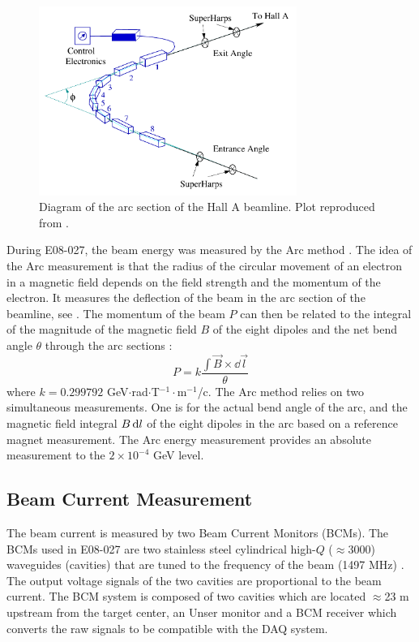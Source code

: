 \begin{figure}[b!]
  \centering
  \includegraphics[width=0.75\textwidth]{figs/arc-measurement.pdf}
  \caption[Diagram of the arc section of the beamline.]{Diagram of the arc section of the Hall A beamline. Plot reproduced from \cite{Zheng2002}.  \label{C5S2SS1F1}}
\end{figure}

During E08-027, the beam energy was measured by the Arc method \cite{Alcorn2004}. The idea of the Arc measurement is that the radius of the circular movement of an electron in a magnetic field depends on the field strength and the momentum of the electron. It measures the deflection of the beam in the arc section of the beamline, see . The momentum of the beam $P$ can then be related to the integral of the magnitude of the magnetic field $B$ of the eight dipoles and the net bend angle $\theta$ through the arc sections \cite{BEAMENERGYARC}:
\begin{equation} \label{C5S2SS1E1}
P = k \frac{\int\vec{B}\times\dd{\vec{l}}}{\theta}
\end{equation}
where $k=0.299792$ GeV$\cdot$rad$\cdot$T${}^{-1}\cdot$m${}^{-1}$/c. The Arc method relies on two simultaneous measurements. One is for the actual bend angle of the arc, and the magnetic field integral $B\dd{l}$ of the eight dipoles in the arc based on a reference magnet measurement. The Arc energy measurement provides an absolute measurement to the $2\times10^{-4}$ GeV level.

\subsection{Beam Current Measurement}
\label{C5S2SS2}

The beam current is measured by two Beam Current Monitors (BCMs). The BCMs used in E08-027 are two stainless steel cylindrical high-$Q$ ($\approx$3000) waveguides (cavities) that are tuned to the frequency of the beam (1497 MHz) \cite{Alcorn2004}. The output voltage signals of the two cavities are proportional to the beam current. The BCM system is composed of two cavities which are located $\approx$23 m upstream from the target center, an Unser monitor and a BCM receiver which converts the raw signals to be compatible with the DAQ system.

